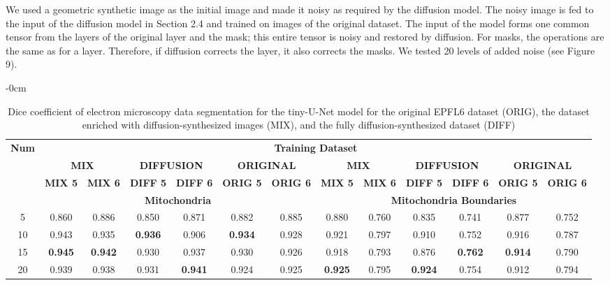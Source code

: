 \documentclass[journal,article,submit,pdftex,moreauthors]{Definitions/mdpi}
\begin{document}
We used a geometric synthetic image as the initial image and made it noisy as required by the diffusion model. The noisy image is fed to the input of the diffusion model in Section 2.4 and trained on images of the original dataset. The input of the model forms one common tensor from the layers of the original layer and the mask; this entire tensor is noisy and restored by diffusion. For masks, the operations are the same as for a layer. Therefore, if diffusion corrects the layer, it also corrects the masks. We tested 20 levels of added noise (see Figure 9).

\begin{table}[H]
	\caption{Dice coefficient of electron microscopy data segmentation for the tiny-U-Net model for the original EPFL6 dataset (ORIG), the dataset enriched with diffusion-synthesized images (MIX), and the fully diffusion-synthesized dataset (DIFF)}
		\begin{adjustwidth}{-\extralength}{0cm}
			{\fontsize{9.35pt}{10pt}\selectfont
			\begin{tabularx}{\fulllength}{ccccccc|cccccc}
				\toprule
					\multirow{3}{*}{\textbf{Num}} & \multicolumn{12}{c}{\textbf{Training Dataset}}\\
				\cmidrule(lr){2-13}
					& \multicolumn{2}{c}{\textbf{MIX}} & \multicolumn{2}{c}{\textbf{DIFFUSION}} & \multicolumn{2}{c|}{\textbf{ORIGINAL}} & \multicolumn{2}{c}{\textbf{MIX}} & \multicolumn{2}{c}{\textbf{DIFFUSION}} & \multicolumn{2}{c}{\textbf{ORIGINAL}}\\
      		& \textbf{MIX 5} & \textbf{MIX 6} & \textbf{DIFF 5} & \textbf{DIFF 6} & \textbf{ORIG 5} & \textbf{ORIG 6} & \textbf{MIX 5} & \textbf{MIX 6} & \textbf{DIFF 5} & \textbf{DIFF 6} & \textbf{ORIG 5} & \textbf{ORIG 6}\\
      	\midrule
					& \multicolumn{6}{c}{\textbf{Mitochondria}} & \multicolumn{6}{c}{\textbf{Mitochondria Boundaries}}\\
				\cmidrule(lr){1-13}
					5 & 0.860 & 0.886 & 0.850 & 0.871 & 0.882 & 0.885 & 0.880 & 0.760 & 0.835 & 0.741 & 0.877 & 0.752\\
					10 & 0.943 & 0.935 & \textbf{0.936} & 0.906 & \textbf{0.934} & 0.928 & 0.921 & 0.797 & 0.910 & 0.752 & 0.916 & 0.787 \\
					15 & \textbf{0.945} & \textbf{0.942} & 0.930 & 0.937 & 0.930 & 0.926 & 0.918 & 0.793 & 0.876 & \textbf{0.762} & \textbf{0.914} & 0.790\\
					20 & 0.939 & 0.938 & 0.931 & \textbf{0.941} & 0.924 & 0.925 & \textbf{0.925} & 0.795 & \textbf{0.924} & 0.754 & 0.912 & 0.794\\

\end{tabularx}}
\end{adjustwidth}
\end{table}
\end{document}
